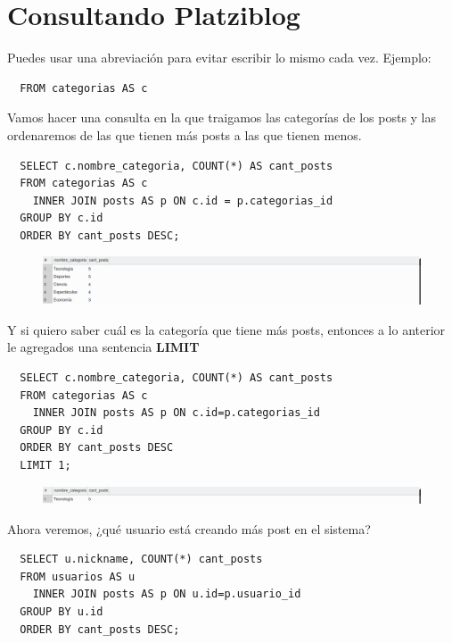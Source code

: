 \documentclass{article}
\begin{document}
\section{Consultando Platziblog}%
Puedes usar una abreviación para evitar escribir lo mismo cada vez. Ejemplo:\\

\begin{verbatim}
  FROM categorias AS c
\end{verbatim}

Vamos hacer una consulta en la que traigamos las categorías de los posts y las
ordenaremos de las que tienen más posts a las que tienen menos.\\

\begin{verbatim}
  SELECT c.nombre_categoria, COUNT(*) AS cant_posts
  FROM categorias AS c
    INNER JOIN posts AS p ON c.id = p.categorias_id
  GROUP BY c.id
  ORDER BY cant_posts DESC;
\end{verbatim}
\begin{figure}[h!]
  \centering
  \includegraphics[scale=0.5]{./Pictures/138_fourth_question.png}
\end{figure}

Y si quiero saber cuál es la categoría que tiene más posts, entonces a lo
anterior le agregados una sentencia \textbf{LIMIT}\\

\begin{verbatim}
  SELECT c.nombre_categoria, COUNT(*) AS cant_posts
  FROM categorias AS c
    INNER JOIN posts AS p ON c.id=p.categorias_id
  GROUP BY c.id
  ORDER BY cant_posts DESC
  LIMIT 1;
\end{verbatim}

\begin{figure}[h!]
  \centering
  \includegraphics[scale=0.5]{./Pictures/139_fifth_question.png}
\end{figure}

Ahora veremos, ¿qué usuario está creando más post en el sistema?\\

\begin{verbatim}
  SELECT u.nickname, COUNT(*) cant_posts
  FROM usuarios AS u
    INNER JOIN posts AS p ON u.id=p.usuario_id
  GROUP BY u.id
  ORDER BY cant_posts DESC;
\end{verbatim}
\end{document}
